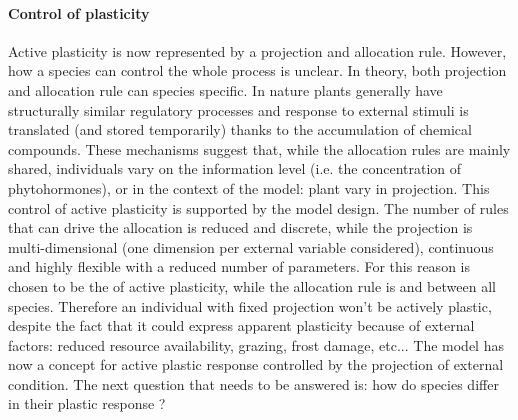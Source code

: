 \paragraph{Control of plasticity}
Active plasticity is now represented by a projection and allocation rule. However, how a species can control the whole process is unclear. In theory, both projection and allocation rule can species specific. In nature plants generally have structurally similar regulatory processes and response to external stimuli is translated (and stored temporarily) thanks to the accumulation of chemical compounds\cite{need-references}. These mechanisms suggest that, while the allocation rules are mainly shared, individuals vary on the information level (i.e. the concentration of phytohormones), or in the context of the model: plant vary in projection. This control of active plasticity is supported by the model design. The number of rules that can drive the allocation is reduced and discrete, while the projection is multi-dimensional (one dimension per external variable considered), continuous and highly flexible with a reduced number of parameters.
For this reason  is chosen to be the  of active plasticity, while the allocation rule is  and  between all species. Therefore an individual with fixed projection won't be actively plastic, despite the fact that it could express apparent plasticity because of external factors: reduced resource availability, grazing, frost damage, etc... The model has now a concept for active plastic response controlled by the projection of external condition. The next question that needs to be answered is: how do species differ in their plastic response ?\\


